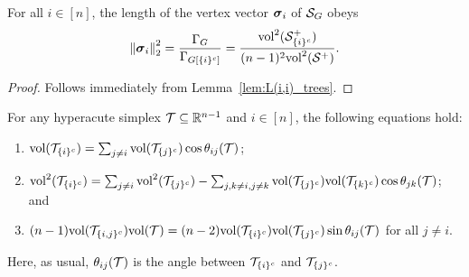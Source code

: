 \begin{corollary}
	For all $i\in[n]$, the length of the vertex vector $\vb*{\sigma}_i$ of $\mathcal{S}_G$ obeys
	\begin{equation}
	\label{eq:||sv_i||_vol}
	\norm{\vb*{\sigma}_i}_2^2 = \frac{\Gamma_G}{\Gamma_{G[{\{i\}^c}]}} = \frac{\textnormal{vol}^2(\mathcal{S}_{\{i\}^c}^+)}{(n-1)^2\textnormal{vol}^2(\mathcal{S}^+)}.
	\end{equation}
\end{corollary}
\begin{proof}
	Follows immediately from Lemma~\ref{lem:L(i,i)_trees}. 
\end{proof}

\begin{lemma}
	\label{lem:volT_multi}
	For any hyperacute simplex $\mathcal{T}\subseteq\mathbb{R}^{n-1}$ and  $i\in[n]$, the following equations hold:
	\begin{enumerate}
		\item $\textnormal{vol}(\mathcal{T}_{\{i\}^c}) = \sum_{j\neq i}\textnormal{vol}(\mathcal{T}_{\{j\}^c})\cos\theta_{ij}(\mathcal{T})$;
		\item $\textnormal{vol}^2(\mathcal{T}_{\{i\}^c}) =  \sum_{j\neq i}\textnormal{vol}^2(\mathcal{T}_{\{j\}^c}) - \sum_{j,k\neq i,j\neq k} \textnormal{vol}(\mathcal{T}_{\{j\}^c})\textnormal{vol}(\mathcal{T}_{\{k\}^c})\cos\theta_{jk}(\mathcal{T})$; and
		\item $(n-1)\textnormal{vol}(\mathcal{T}_{\{i,j\}^c})\textnormal{vol}(\mathcal{T}) = (n-2)\textnormal{vol}(\mathcal{T}_{\{i\}^c})\textnormal{vol}(\mathcal{T}_{\{j\}^c})\sin\theta_{ij}(\mathcal{T})$ for  all $j\neq i$. 
	\end{enumerate}
	Here, as usual, $\theta_{ij}(\mathcal{T})$ is the angle between $\mathcal{T}_{\{i\}^c}$ and $\mathcal{T}_{\{j\}^c}$. 
\end{lemma}

